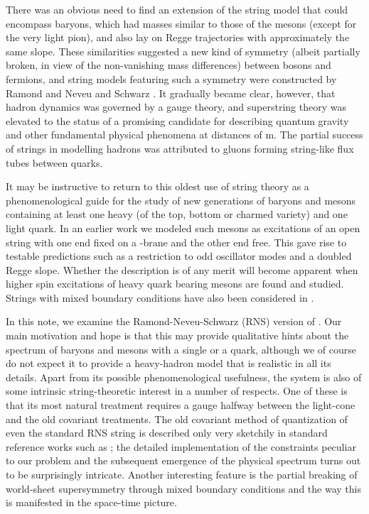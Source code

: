 \documentclass[a4paper,a4paper]{article}
\begin{document}
There was an obvious need to find an extension of the string model
that could encompass baryons, which had masses similar to those of
the mesons (except for the very light pion), and also lay
on Regge trajectories with approximately the same slope.  These
similarities suggested a new kind of symmetry (albeit partially
broken, in view of the non-vanishing mass differences) between
bosons and fermions, and string models featuring such a symmetry
were constructed by Ramond \cite{Ramond} and Neveu and Schwarz
\cite{NS}.  It gradually became clear, however, that
hadron dynamics was governed by a gauge theory, and
superstring theory was elevated to the status of a promising candidate
for describing quantum gravity and other fundamental physical phenomena at
distances of \coordHE{} m.  The partial success of strings in modelling
hadrons was attributed to gluons forming string-like flux tubes between
quarks.

It may be instructive to return to this oldest use
of string theory as a phenomenological guide for the study of new
generations of baryons and mesons containing at least one heavy
(of the top, bottom or charmed variety) and one light quark. In an
earlier work \cite{Gursoy} we modeled such mesons as excitations of an
open string with one end fixed on a \coordHE{}-brane and the other end free.
This gave rise to testable predictions such as a restriction to
odd oscillator modes and a doubled Regge slope.  Whether the
description is of any merit will become apparent when higher
spin excitations
of heavy quark bearing mesons are found and studied.  Strings with mixed
boundary conditions have also been considered in
\cite{Fair,Sieg,Klein,Froh}.

In this note, we examine the Ramond-Neveu-Schwarz (RNS) version of
\cite{Gursoy}.  Our  main motivation and hope is that this may
provide qualitative hints about the spectrum of baryons and mesons
with a single \coordHE{} or a \coordHE{} quark, although we of course do not expect
it to provide a heavy-hadron  model that is realistic in all its details.
Apart from its possible phenomenological usefulness, the system is
also of some intrinsic string-theoretic interest in a number of respects.
One of
these is that its most natural treatment requires a gauge halfway
between the light-cone and the old covariant treatments.  The old
covariant method of quantization of even the standard RNS string
is described only very sketchily in standard reference works such
as \cite{GSW,Pol,Pol2}; the detailed implementation of the constraints
peculiar to our problem  and the subsequent emergence of the physical
spectrum turns out to be surprisingly intricate.  Another
interesting feature is the partial breaking of world-sheet
supersymmetry through mixed boundary conditions and the way this
is manifested in the space-time picture.
\end{document}
